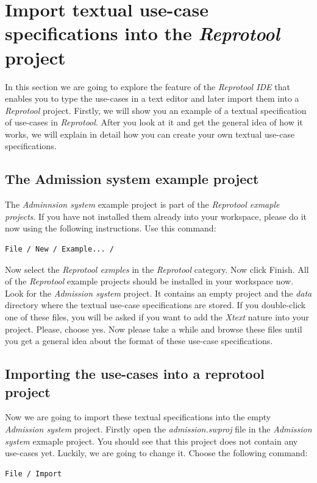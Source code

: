 \section{Import textual use-case specifications into the \emph{Reprotool} project}

In this section we are going to explore the feature of the \emph{Reprotool IDE} that enables you to type the use-cases in a text
editor and later import them into a \emph{Reprotool} project. Firstly, we will show you an example of a textual specification
of use-cases in \emph{Reprotool}. After you look at it and get the general idea of how it works, we will explain in detail how you can
create your own textual use-case specifications.

\subsection{The Admission system example project}

The \emph{Adminnsion system} example project is part of the \emph{Reprotool exmaple projects}. If you have not installed them
already into your workspace, please do it now using the following instructions. Use this command:
\begin{verbatim}
File / New / Example... /
\end{verbatim}

Now select the \emph{Reprotool exmples} in the \emph{Reprotool} category. Now click Finish. All of the \emph{Reprotool} example projects
should be installed in your workspace now. Look for the \emph{Admission system} project.
It contains an empty project and the \emph{data} directory where the textual use-case specifications are stored. If you double-click one
of these files, you will be asked if you want to add the \emph{Xtext} nature into your project. Please, choose yes. Now please take a
while and browse these files until you get a general idea about the format of these use-case specifications.

\subsection{Importing the use-cases into a reprotool project}

Now we are going to import these textual specifications into the empty \emph{Admission system} project. Firstly open the
\emph{admission.swproj} file in the \emph{Admission system} exmaple project. You should see that this project does not contain any
use-cases yet. Luckily, we are going to change it. Choose the following command:
\begin{verbatim}
File / Import
\end{verbatim}

